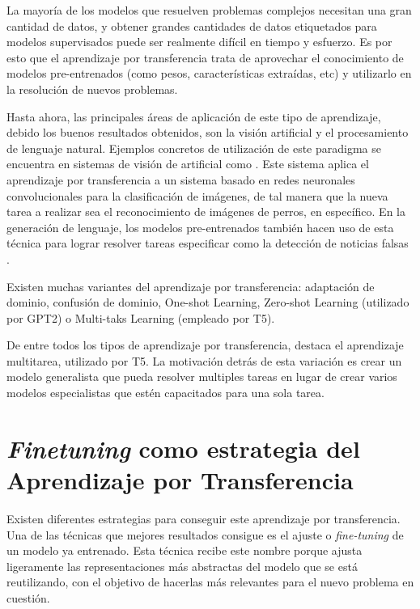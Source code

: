 La mayoría de los modelos que resuelven problemas complejos necesitan una gran cantidad de datos, y obtener grandes cantidades de datos etiquetados para modelos supervisados puede ser realmente difícil en tiempo y esfuerzo. Es por esto que el aprendizaje por transferencia trata de aprovechar el conocimiento de modelos pre-entrenados (como pesos, características extraídas, etc) y utilizarlo en la resolución de nuevos problemas. 

Hasta ahora, las principales áreas de aplicación de este tipo de aprendizaje, debido los buenos resultados obtenidos, son la visión artificial y el procesamiento de lenguaje natural. Ejemplos concretos de utilización de este paradigma se encuentra en sistemas de visión de artificial como \citep{xinyuan2018}. Este sistema aplica el aprendizaje por transferencia a un sistema basado en redes neuronales convolucionales para la clasificación de imágenes, de tal manera que la nueva tarea a realizar sea el reconocimiento de imágenes de perros, en específico. En la generación de lenguaje, los modelos pre-entrenados también hacen uso de esta técnica para lograr resolver tareas especificar como la detección de noticias falsas \citep{slovikovskaya2019transfer}.

Existen muchas variantes del aprendizaje por transferencia: adaptación de dominio, confusión de dominio, One-shot Learning, Zero-shot Learning (utilizado por GPT2) o Multi-taks Learning (empleado por T5). 


De entre todos los tipos de aprendizaje por transferencia, destaca el aprendizaje multitarea, utilizado por T5. La motivación detrás de esta variación es crear un modelo generalista que pueda resolver multiples tareas en lugar de crear varios modelos especialistas que estén capacitados para una sola tarea.


\section{\textit{Finetuning} como estrategia del Aprendizaje por Transferencia}

Existen diferentes estrategias para conseguir este aprendizaje por transferencia. Una de las técnicas que mejores resultados consigue es el ajuste o \textit{fine-tuning} de un modelo ya entrenado. Esta técnica recibe este nombre porque ajusta ligeramente las representaciones más abstractas del modelo que se está reutilizando, con el objetivo de hacerlas más relevantes para el nuevo problema en cuestión.

